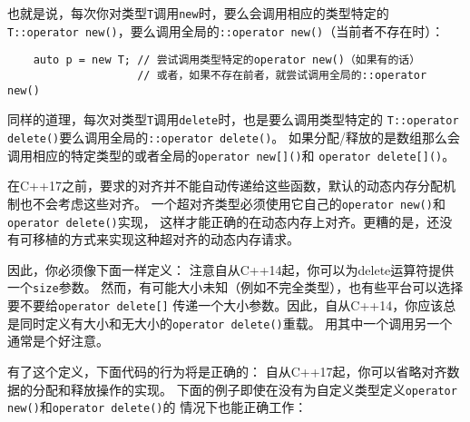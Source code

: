 也就是说，每次你对类型\texttt{T}调用\texttt{new}时，要么会调用相应的类型特定的
\texttt{T::operator new()}，要么调用全局的\texttt{::operator new()}（当前者不存在时）：
\begin{lstlisting}
    auto p = new T; // 尝试调用类型特定的operator new()（如果有的话）
                    // 或者，如果不存在前者，就尝试调用全局的::operator new()
\end{lstlisting}
同样的道理，每次对类型\texttt{T}调用\texttt{delete}时，也是要么调用类型特定的
\texttt{T::operator delete()}要么调用全局的\texttt{::operator delete()}。
如果分配/释放的是数组那么会调用相应的特定类型的或者全局的\texttt{operator new[]()}和
\texttt{operator delete[]()}。

在C++17之前，要求的对齐并不能自动传递给这些函数，默认的动态内存分配机制也不会考虑这些对齐。
一个超对齐类型必须使用它自己的\texttt{operator new()}和\texttt{operator delete()}实现，
这样才能正确的在动态内存上对齐。更糟的是，还没有可移植的方式来实现这种超对齐的动态内存请求。

因此，你必须像下面一样定义：
注意自从C++14起，你可以为delete运算符提供一个\texttt{size}参数。
然而，有可能大小未知（例如不完全类型），也有些平台可以选择要不要给\texttt{operator delete[]}
传递一个大小参数。因此，自从C++14，你应该总是同时定义有大小和无大小的\texttt{operator delete()}重载。
用其中一个调用另一个通常是个好注意。

有了这个定义，下面代码的行为将是正确的：
自从C++17起，你可以省略对齐数据的分配和释放操作的实现。
下面的例子即使在没有为自定义类型定义\texttt{operator new()}和\texttt{operator delete()}的
情况下也能正确工作：

